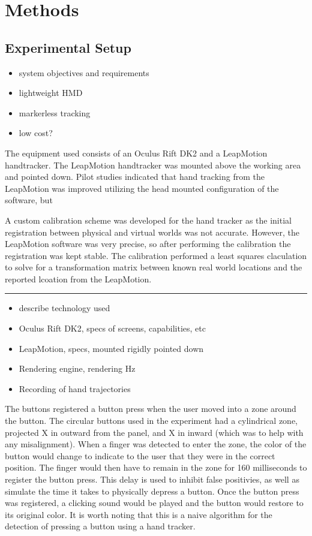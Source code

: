 \section{Methods}

\subsection{Experimental Setup}

\begin{itemize}
  \item system objectives and requirements
  \item lightweight HMD
  \item markerless tracking
  \item low cost?
\end{itemize}

The equipment used consists of an Oculus Rift DK2 and a LeapMotion handtracker.
The LeapMotion handtracker was mounted above the working area and pointed down.
Pilot studies indicated that hand tracking from the LeapMotion was improved utilizing the head mounted configuration of the software, but 

A custom calibration scheme was developed for the hand tracker as the initial registration between physical and virtual worlds was not accurate.
However, the LeapMotion software was very precise, so after performing the calibration the registration was kept stable.
The calibration performed a least squares claculation to solve for a transformation matrix between known real world locations and the reported lcoation from the LeapMotion.



\rule{0.75\textwidth}{1pt}
\begin{itemize}
  \item describe technology used
  \item Oculus Rift DK2, specs of screens, capabilities, etc
  \item LeapMotion, specs, mounted rigidly pointed down
  \item Rendering engine, rendering Hz
  \item Recording of hand trajectories
\end{itemize}

The buttons registered a button press when the user moved into a zone around the button.
The circular buttons used in the experiment had a cylindrical zone, projected X in outward from the panel, and X in inward (which was to help with any misalignment).
When a finger was detected to enter the zone, the color of the button would change to indicate to the user that they were in the correct position.
The finger would then have to remain in the zone for 160 milliseconds to register the button press.
This delay is used to inhibit false positivies, as well as simulate the time it takes to physically depress a button.
Once the button press was registered, a clicking sound would be played and the button would restore to its original color.
It is worth noting that this is a naive algorithm for the detection of pressing a button using a hand tracker.


